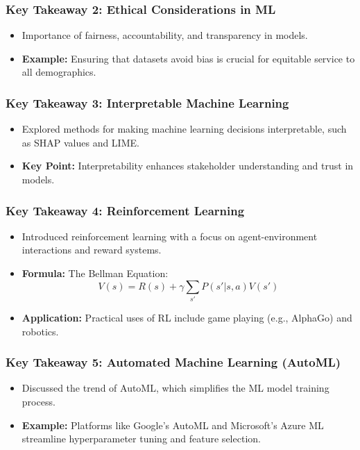 \documentclass[aspectratio=169]{beamer}
\begin{document}
\begin{frame}[fragile]
    \frametitle{Key Takeaway 2: Ethical Considerations in ML}
    \begin{itemize}
        \item Importance of fairness, accountability, and transparency in models.
        \item \textbf{Example:} Ensuring that datasets avoid bias is crucial for equitable service to all demographics.
    \end{itemize}
\end{frame}

\begin{frame}[fragile]
    \frametitle{Key Takeaway 3: Interpretable Machine Learning}
    \begin{itemize}
        \item Explored methods for making machine learning decisions interpretable, such as SHAP values and LIME.
        \item \textbf{Key Point:} Interpretability enhances stakeholder understanding and trust in models.
    \end{itemize}
\end{frame}

\begin{frame}[fragile]
    \frametitle{Key Takeaway 4: Reinforcement Learning}
    \begin{itemize}
        \item Introduced reinforcement learning with a focus on agent-environment interactions and reward systems.
        \item \textbf{Formula:} The Bellman Equation:
        \begin{equation}
        V(s) = R(s) + \gamma \sum_{s'} P(s'|s,a)V(s')
        \end{equation}
        \item \textbf{Application:} Practical uses of RL include game playing (e.g., AlphaGo) and robotics.
    \end{itemize}
\end{frame}

\begin{frame}[fragile]
    \frametitle{Key Takeaway 5: Automated Machine Learning (AutoML)}
    \begin{itemize}
        \item Discussed the trend of AutoML, which simplifies the ML model training process.
        \item \textbf{Example:} Platforms like Google's AutoML and Microsoft's Azure ML streamline hyperparameter tuning and feature selection.
    \end{itemize}
\end{frame}
\end{document}
